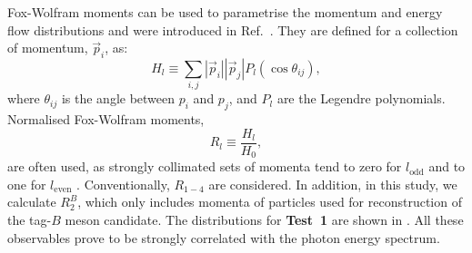 Fox-Wolfram moments can be used to parametrise the momentum and energy flow distributions and were introduced in Ref.~\cite{Fox:1978vu}.
They are defined for a collection of momentum, $\vec{p}_i$, as:
\begin{equation}
    H_l \equiv \sum_{i,j} |\vec{p}_i||\vec{p}_j|P_l(\cos\theta_{ij}),
\end{equation}
where $\theta_{ij}$ is the angle between $p_i$ and $p_j$, and $P_l$ are the Legendre polynomials.
Normalised Fox-Wolfram moments,
\begin{equation}
R_l\equiv \frac{H_l}{H_0},
\end{equation}
are often used, as strongly collimated sets of momenta tend to zero for $l_{\mathrm{odd}}$ and to one for $l_{\mathrm{even}}$ \cite{BaBar:2014omp}.
Conventionally, $R_{1-4}$ are considered.
In addition, in this study, we calculate $R_2^B$, which only includes momenta of particles used for reconstruction of the tag-$B$ meson candidate.
The distributions for \textbf{Test~1} are shown in .
All these observables prove to be strongly correlated with the photon energy spectrum.

